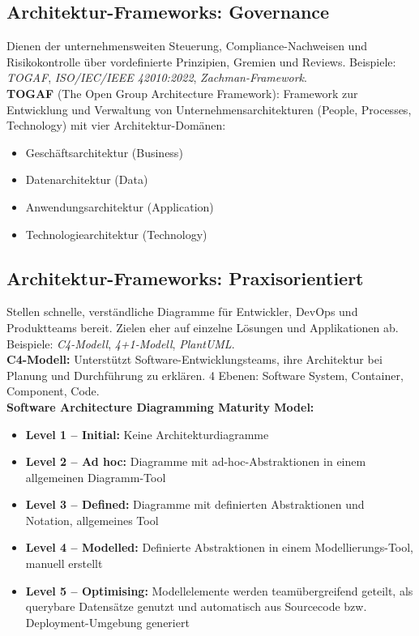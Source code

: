 \newpage

\subsection{Architektur-Frameworks: Governance}
Dienen der unternehmensweiten Steuerung, Compliance-Nachweisen
und Risikokontrolle über vordefinierte Prinzipien, Gremien und Reviews.
Beispiele: \textit{TOGAF}, \textit{ISO/IEC/IEEE 42010:2022}, \textit{Zachman-Framework}.\\[4pt]
\textbf{TOGAF} (The Open Group Architecture Framework): Framework zur
Entwicklung und Verwaltung von Unternehmensarchitekturen (People,
Processes, Technology) mit vier Architektur-Domänen:
\begin{itemize}
    \item Geschäftsarchitektur (Business)
    \item Datenarchitektur (Data)
    \item Anwendungsarchitektur (Application)
    \item Technologiearchitektur (Technology)
\end{itemize}

\subsection{Architektur-Frameworks: Praxisorientiert}
Stellen schnelle, verständliche Diagramme für Entwickler, DevOps und
Produktteams bereit. Zielen eher auf einzelne Lösungen und Applikationen
ab. Beispiele: \textit{C4-Modell}, \textit{4+1-Modell}, \textit{PlantUML}.\\[4pt]
\textbf{C4-Modell:} Unterstützt Software-Entwicklungsteams, ihre
Architektur bei Planung und Durchführung zu erklären.
4 Ebenen: Software System, Container, Component, Code.\\[4pt]
\textbf{Software Architecture Diagramming Maturity Model:}
\begin{itemize}
    \item \textbf{Level 1 -- Initial:} Keine Architekturdiagramme
    \item \textbf{Level 2 -- Ad hoc:} Diagramme mit ad-hoc-Abstraktionen
          in einem allgemeinen Diagramm-Tool
    \item \textbf{Level 3 -- Defined:} Diagramme mit definierten
          Abstraktionen und Notation, allgemeines Tool
    \item \textbf{Level 4 -- Modelled:} Definierte Abstraktionen in
          einem Modellierungs-Tool, manuell erstellt
    \item \textbf{Level 5 -- Optimising:} Modellelemente werden
          teamübergreifend geteilt, als querybare Datensätze genutzt
          und automatisch aus Sourcecode bzw. Deployment-Umgebung
          generiert
\end{itemize}


